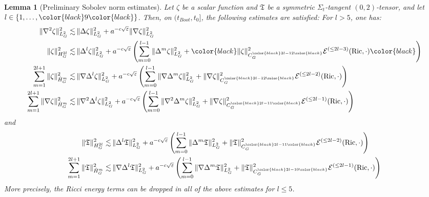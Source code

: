 \documentclass[11pt,leqno,textwidth=10cm]{amsart}
\numberwithin{equation}{section}
\theoremstyle{definition}
\theoremstyle{plain}
\newtheorem{lemma}[definition]{Lemma}
\newcommand{\1}{\mathbbm{1}}
\newcommand{\E}{\mathcal{E}}
\newcommand{\Ric}{\text{\normalfont{Ric}}}
\renewcommand{\epsilon}{\varepsilon}
\newcommand{\Lap}{\Delta}
\newcommand{\change}[1]{\color{black}#1\color{black}}
\begin{document}
\begin{lemma}[Preliminary Sobolev norm estimates]\label{lem:Sobolev-norm-equivalence-improved} Let $\zeta$ be a scalar function and $\mathfrak{T}$ be a symmetric $\Sigma_t$-tangent $(0,2)$-tensor, and let $l\in\{1,\dots,\change{9}\}$. Then, on $(t_{Boot},t_0]$, the following estimates are satisfied: For $l>5$, one has:
\begin{subequations}
\begin{align}
\|\nabla^2\zeta\|_{L^2_G}^2\lesssim&\,\|\Lap\zeta\|_{L^2_G}^2+a^{-c\sqrt{\epsilon}}\|\nabla\zeta\|_{L^2_G}^2\label{eq:Sobolev-norm-equiv-zetalow}\\
\|\zeta\|_{H^{2l}_G}^2\lesssim&\,\|\Lap^{l} \zeta\|_{L^2_G}^2+a^{-c\sqrt{\epsilon}}\left(\sum_{m=0}^{l-1}\|\Lap^m\zeta\|_{L^2_G}^2+\change{\|\zeta\|_{C_G^{\change{2l-12}}}^2\E^{(\leq 2l-3)}(\Ric,\cdot)}\right) \label{eq:Sobolev-norm-equiv-zeta2l}\\
\sum_{m=1}^{2l+1}\|\zeta\|_{\dot{H}^{m}_G}^2\lesssim&\,\|\nabla\Lap^{l}\zeta\|_{L^2_G}^2+a^{-c\sqrt{\epsilon}}\left(\sum_{m=0}^{l-1}\|\nabla\Lap^m\zeta\|_{L^2_G}^2+\|\nabla\zeta\|_{C_G^{\change{2l-12}}}^2\E^{(\leq2l-2)}(\Ric,\cdot)\right)\label{eq:Sobolev-norm-equiv-zeta2l+1}\\
\sum_{m=1}^{2l+1}\|\nabla\zeta\|_{\dot{H}^{m}_G}^2\lesssim&\,\|\nabla^2\Lap^l\zeta\|_{L^2_G}^2+a^{-c\sqrt{\epsilon}}\left(\sum_{m=0}^{l-1}\|\nabla^2\Lap^m\zeta\|_{L^2_G}^2+\|\nabla\zeta\|_{C_G^{\change{2l-11}}}^2\E^{(\leq 2l-1)}(\Ric,\cdot)\right)\label{eq:Sobolev-norm-equiv-nablazeta2l+1}
\end{align}
\end{subequations}
and
\begin{subequations}
\begin{align}
\|\mathfrak{T}\|_{H^{2l}_G}^2\lesssim&\,\|\Lap^{l} \mathfrak{T}\|_{L^2_G}^2+a^{-c\sqrt{\epsilon}}\left(\sum_{m=0}^{l-1}\|\Lap^m\mathfrak{T}\|_{L^2_G}^2+\|\mathfrak{T}\|_{C_G^{\change{2l-11}}}^2\E^{(\leq 2l-2)}(\Ric,\cdot)\right)\label{eq:Sobolev-norm-equiv-T2l}\\
\sum_{m=1}^{2l+1}\|\mathfrak{T}\|_{\dot{H}^{m}_G}^2\lesssim&\,\|\nabla\Lap^{l}\mathfrak{T}\|_{L^2_G}^2+a^{-c\sqrt{\epsilon}}\left(\sum_{m=0}^{l-1}\|\nabla\Lap^m\mathfrak{T}\|_{L^2_G}^2+\|\mathfrak{T}\|_{C_G^{\change{2l-10}}}^2\E^{(\leq2l-1)}(\Ric,\cdot)\right)\label{eq:Sobolev-norm-equiv-T2l+1}
\end{align}
\end{subequations}
More precisely, the Ricci energy terms can be dropped in all of the above estimates for $l\leq 5$.
\end{lemma}
\end{document}
